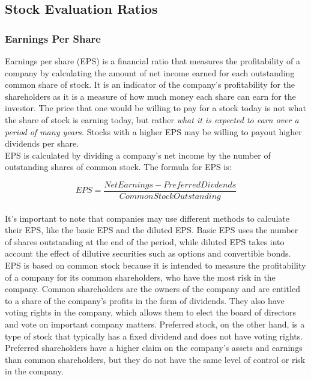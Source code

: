 \documentclass{article}
\begin{document}
\subsection{Stock Evaluation Ratios}
\subsubsection{Earnings Per Share}
Earnings per share (EPS) is a financial ratio that measures the profitability of a company by calculating the amount of net income earned for each outstanding common share of stock. It is an indicator of the company's profitability for the shareholders as it is a measure of how much money each share can earn for the investor. The price that one would be willing to pay for a stock today is not what the share of stock is earning today, but rather \textit{what it is expected to earn over a period of many years.} Stocks with a higher EPS may be willing to payout higher dividends per share. \\

EPS is calculated by dividing a company's net income by the number of outstanding shares of common stock. The formula for EPS is:

\begin{equation}
    EPS = \frac{Net Earnings - PreferredDivdends}{Common Stock Outstanding}
\end{equation}\\

It's important to note that companies may use different methods to calculate their EPS, like the basic EPS and the diluted EPS. Basic EPS uses the number of shares outstanding at the end of the period, while diluted EPS takes into account the effect of dilutive securities such as options and convertible bonds.\\

EPS is based on common stock because it is intended to measure the profitability of a company for its common shareholders, who have the most risk in the company. Common shareholders are the owners of the company and are entitled to a share of the company's profits in the form of dividends. They also have voting rights in the company, which allows them to elect the board of directors and vote on important company matters. Preferred stock, on the other hand, is a type of stock that typically has a fixed dividend and does not have voting rights. Preferred shareholders have a higher claim on the company's assets and earnings than common shareholders, but they do not have the same level of control or risk in the company.\\
\end{document}
